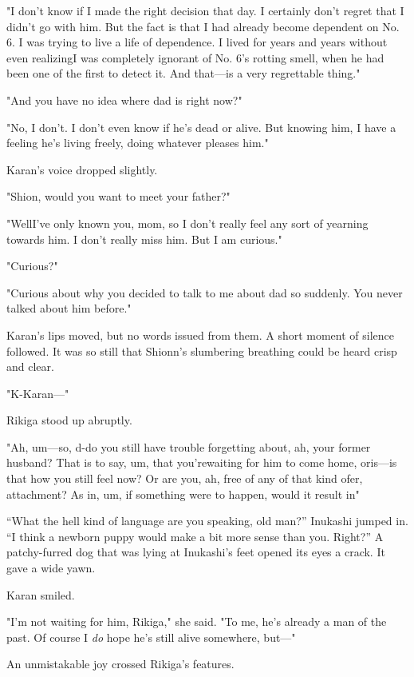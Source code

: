 "I don't know if I made the right decision that day. I certainly don't
regret that I didn't go with him. But the fact is that I had already
become dependent on No. 6. I was trying to live a life of dependence. I
lived for years and years without even realizing\el I was completely
ignorant of No. 6's rotting smell, when he had been one of the first to
detect it. And that---is a very regrettable thing."

"And you have no idea where dad is right now?"

"No, I don't. I don't even know if he's dead or alive. But knowing him,
I have a feeling he's living freely, doing whatever pleases him."

Karan's voice dropped slightly.

"Shion, would you want to meet your father?"

"Well\el I've only known you, mom, so I don't really feel any sort of
yearning towards him. I don't really miss him. But I am curious."

"Curious?"

"Curious about why you decided to talk to me about dad so suddenly. You
never talked about him before."

Karan's lips moved, but no words issued from them. A short moment of
silence followed. It was so still that Shionn's slumbering breathing
could be heard crisp and clear.

\mybreak

"K-Karan---"

Rikiga stood up abruptly.

"Ah, um---so, d-do you still have trouble forgetting about, ah, your
former husband? That is to say, um, that you're\el waiting for him to
come home, or\el is---is that how you still feel now? Or are you, ah, free
of any of that kind of\el er, attachment? As in, um, if something were
to happen, would it result in\el "

``What the hell kind of language are you speaking, old man?'' Inukashi
jumped in. ``I think a newborn puppy would make a bit more sense than
you. Right?'' A patchy-furred dog that was lying at Inukashi's feet
opened its eyes a crack. It gave a wide yawn.

Karan smiled.

"I'm not waiting for him, Rikiga," she said. "To me, he's already a man
of the past. Of course I \emph{do} hope he's still alive somewhere, but---"

An unmistakable joy crossed Rikiga's features.

